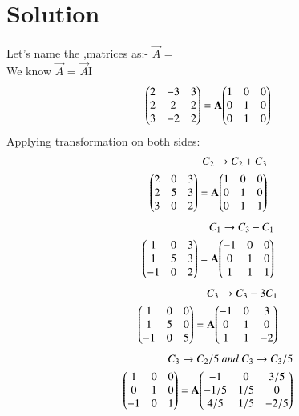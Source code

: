 \documentclass[journal,12pt,twocolumn]{IEEEtran}
\begin{document}
\section{\textbf{Solution}}
Let's name the ,matrices as:-
$\vec{A}$ = \\
We know 
$\vec{A}$ = $\vec{A}$I\\
\begin{align}
{\ensuremath{\begin{pmatrix}2 & -3 & 3\\ 2 & 2 & 2\\ 3 & -2 & 2\end{pmatrix}}} =\mathbf{A}
{\begin{pmatrix}1 & 0 & 0\\0 & 1 & 0\\0 & 1 & 0\end{pmatrix}}
\end{align}
%
Applying transformation on both sides:
\begin{align}
\ {C_2\rightarrow C_2+ C_3 } \\
{\begin{pmatrix}2 & 0 & 3\\ 2 & 5 & 3\\ 3 & 0 & 2\end{pmatrix}} =\mathbf{A} {\begin{pmatrix}1 & 0 & 0\\0 & 1 & 0\\0 & 1 & 1\end{pmatrix}}
\end{align}
\begin{align}
\ {C_1\rightarrow C_3- C_1 } \\ 
{\begin{pmatrix}1 & 0 & 3\\ 1 & 5 & 3\\ -1 & 0 & 2\end{pmatrix}} =\mathbf{A} {\begin{pmatrix}-1 & 0 & 0\\0 & 1 & 0\\1 & 1 & 1\end{pmatrix}}
\end{align}
\begin{align}
\ {C_3\rightarrow C_3- 3C_1 }\\
{\begin{pmatrix}1 & 0 & 0\\ 1 & 5 & 0\\ -1 & 0 & 5\end{pmatrix}} =\mathbf{A} {\begin{pmatrix}-1 & 0 & 3\\0 & 1 & 0\\1 & 1 & -2\end{pmatrix}}
\end{align}
\begin{align}
\ {C_3\rightarrow C_2/5} 
\ and 
\ {C_3\rightarrow C_3/5}\\
{\begin{pmatrix}1 & 0 & 0\\ 0 & 1 & 0\\ -1 & 0 & 1\end{pmatrix}} =\mathbf{A} {\begin{pmatrix}-1 & 0 & 3/5\\-1/5 & 1/5 & 0\\4/5 & 1/5 & -2/5\end{pmatrix}}
\end{align}
\end{document}
